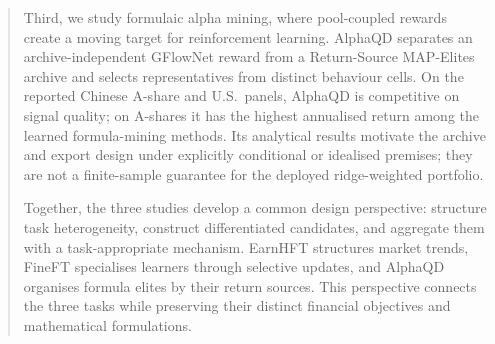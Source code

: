 \documentclass[12pt,a4paper]{Thesis} %
\begin{document}
\begin{abstract}
Third, we study formulaic alpha mining, where pool-coupled rewards create a moving target for reinforcement learning. AlphaQD separates an archive-independent GFlowNet reward from a Return-Source MAP-Elites archive and selects representatives from distinct behaviour cells. On the reported Chinese A-share and U.S.\ panels, AlphaQD is competitive on signal quality; on A-shares it has the highest annualised return among the learned formula-mining methods. Its analytical results motivate the archive and export design under explicitly conditional or idealised premises; they are not a finite-sample guarantee for the deployed ridge-weighted portfolio.

Together, the three studies develop a common design perspective: structure task heterogeneity, construct differentiated candidates, and aggregate them with a task-appropriate mechanism. EarnHFT structures market trends, FineFT specialises learners through selective updates, and AlphaQD organises formula elites by their return sources. This perspective connects the three tasks while preserving their distinct financial objectives and mathematical formulations.
\end{abstract}

\listoffigures %

\listoftables %

\begin{spacing}{1}
\listofalgorithms %
\end{spacing}
\cleardoublepage



%
%

\end{document}
